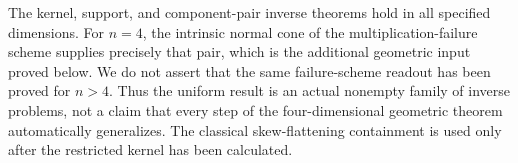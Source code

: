 \begin{remark}
\label{rem:uniform-versus-intrinsic}
The kernel, support, and component-pair inverse theorems hold in all
specified dimensions.  For \(n=4\), the intrinsic normal cone of
the multiplication-failure scheme supplies precisely that pair,
which is the additional geometric input proved below.  We do not
assert that the same failure-scheme readout has been proved for
\(n>4\).  Thus the uniform result is an actual nonempty family of
inverse problems, not a claim that every step of the four-dimensional
geometric theorem automatically generalizes.  The classical
skew-flattening containment is used only after the restricted kernel
has been calculated.
\end{remark}
